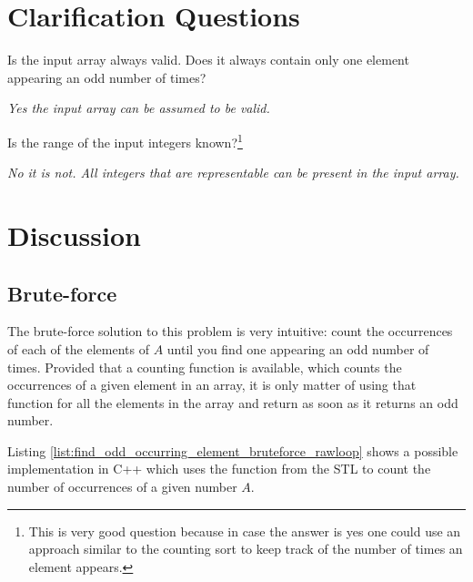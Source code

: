 \section{Clarification Questions}

\begin{QandA}
	\item Is the input array always valid. Does it always contain only one element appearing an odd number of times?
	\begin{answered}
		\textit{Yes the input array can be assumed to be valid.}
	\end{answered}
	\item  Is the range of the input integers known?\footnote{ This is very good question because in case the answer is yes one could use an approach similar to the counting sort to keep track of the number of times an element appears.}
	\begin{answered}
		\textit{No it is not. All integers that are representable can be present in the input array.}
	\end{answered}
	
\end{QandA}

\section{Discussion}

\subsection{Brute-force}
\label{find_odd_occurring_element:sec:bruteforce}
The brute-force solution to this problem is very intuitive: count the occurrences of each of the elements of $A$ until you find one appearing an odd number of times.  
Provided that a counting function is available, which counts the occurrences of a given element in an array, it is only matter of using that function for all the elements in the array and return as soon as it returns an odd number. 

Listing \ref{list:find_odd_occurring_element_bruteforce_rawloop} shows a possible implementation in C++ which uses the  function from the STL to count the number of occurrences of a given number $A$.



